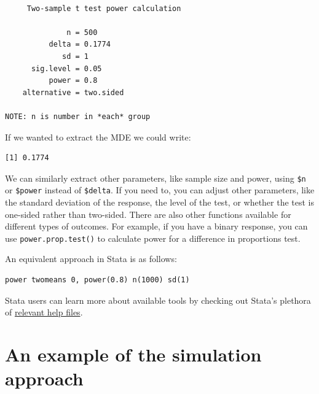 \documentclass[
  12pt,
]{book}
\newenvironment{Shaded}{\begin{snugshade}}{\end{snugshade}}
\newcommand{\AttributeTok}[1]{\textcolor[rgb]{0.77,0.63,0.00}{#1}}
\newcommand{\CommentTok}[1]{\textcolor[rgb]{0.56,0.35,0.01}{\textit{#1}}}
\newcommand{\DecValTok}[1]{\textcolor[rgb]{0.00,0.00,0.81}{#1}}
\newcommand{\FloatTok}[1]{\textcolor[rgb]{0.00,0.00,0.81}{#1}}
\newcommand{\FunctionTok}[1]{\textcolor[rgb]{0.00,0.00,0.00}{#1}}
\newcommand{\NormalTok}[1]{#1}
\newcommand{\SpecialCharTok}[1]{\textcolor[rgb]{0.00,0.00,0.00}{#1}}
\theoremstyle{definition}
\theoremstyle{definition}
\theoremstyle{definition}
\theoremstyle{remark}
\begin{document}
\begin{verbatim}

     Two-sample t test power calculation 

              n = 500
          delta = 0.1774
             sd = 1
      sig.level = 0.05
          power = 0.8
    alternative = two.sided

NOTE: n is number in *each* group
\end{verbatim}

If we wanted to extract the MDE we could write:

\begin{Shaded}
\end{Shaded}

\begin{verbatim}
[1] 0.1774
\end{verbatim}

We can similarly extract other parameters, like sample size and power,
using \texttt{\$n} or \texttt{\$power} instead of \texttt{\$delta}. If
you need to, you can adjust other parameters, like the standard
deviation of the response, the level of the test, or whether the test is
one-sided rather than two-sided. There are also other functions
available for different types of outcomes. For example, if you have a
binary response, you can use \texttt{power.prop.test()} to calculate
power for a difference in proportions test.

An equivalent approach in Stata is as follows:

\begin{verbatim}
power twomeans 0, power(0.8) n(1000) sd(1)
\end{verbatim}

Stata users can learn more about available tools by checking out Stata's
plethora of
\href{https://www.stata.com/features/power-and-sample-size/}{relevant
help files}.

\hypertarget{an-example-of-the-simulation-approach}{%
\section{An example of the simulation
approach}\label{an-example-of-the-simulation-approach}}
\end{document}

